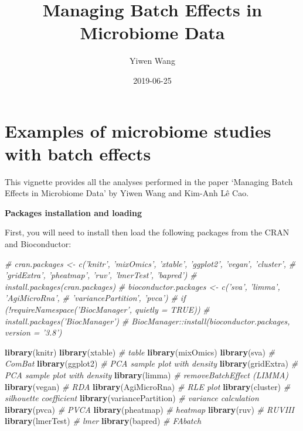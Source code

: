 \documentclass[]{book}
\title{Managing Batch Effects in Microbiome Data}
\author{Yiwen Wang}
\date{2019-06-25}
\newenvironment{Shaded}{\begin{snugshade}}{\end{snugshade}}
\newcommand{\KeywordTok}[1]{\textcolor[rgb]{0.13,0.29,0.53}{\textbf{#1}}}
\newcommand{\CommentTok}[1]{\textcolor[rgb]{0.56,0.35,0.01}{\textit{#1}}}
\newcommand{\NormalTok}[1]{#1}
\begin{document}
\maketitle

{
\setcounter{tocdepth}{3}
\tableofcontents
}
\chapter{Examples of microbiome studies with batch
effects}\label{examples-of-microbiome-studies-with-batch-effects}

This vignette provides all the analyses performed in the paper `Managing
Batch Effects in Microbiome Data' by Yiwen Wang and Kim-Anh Lê Cao.

\textbf{Packages installation and loading}

First, you will need to install then load the following packages from
the CRAN and Bioconductor:

\begin{Shaded}
\begin{Highlighting}[]
\CommentTok{# cran.packages <- c('knitr', 'mixOmics', 'xtable', 'ggplot2', 'vegan', 'cluster',}
\CommentTok{#                   'gridExtra', 'pheatmap', 'ruv', 'lmerTest', 'bapred')}
\CommentTok{# install.packages(cran.packages)}
\CommentTok{# bioconductor.packages <- c('sva', 'limma', 'AgiMicroRna', }
\CommentTok{#                           'variancePartition', 'pvca')}
\CommentTok{# if (!requireNamespace('BiocManager', quietly = TRUE))}
\CommentTok{#     install.packages('BiocManager')}
\CommentTok{# BiocManager::install(bioconductor.packages, version = '3.8')}

\KeywordTok{library}\NormalTok{(knitr)}
\KeywordTok{library}\NormalTok{(xtable) }\CommentTok{# table}
\KeywordTok{library}\NormalTok{(mixOmics)}
\KeywordTok{library}\NormalTok{(sva) }\CommentTok{# ComBat}
\KeywordTok{library}\NormalTok{(ggplot2) }\CommentTok{# PCA sample plot with density}
\KeywordTok{library}\NormalTok{(gridExtra) }\CommentTok{# PCA sample plot with density}
\KeywordTok{library}\NormalTok{(limma) }\CommentTok{# removeBatchEffect (LIMMA)}
\KeywordTok{library}\NormalTok{(vegan) }\CommentTok{# RDA}
\KeywordTok{library}\NormalTok{(AgiMicroRna) }\CommentTok{# RLE plot}
\KeywordTok{library}\NormalTok{(cluster) }\CommentTok{# silhouette coefficient}
\KeywordTok{library}\NormalTok{(variancePartition) }\CommentTok{# variance calculation}
\KeywordTok{library}\NormalTok{(pvca) }\CommentTok{# PVCA}
\KeywordTok{library}\NormalTok{(pheatmap) }\CommentTok{# heatmap}
\KeywordTok{library}\NormalTok{(ruv) }\CommentTok{# RUVIII}
\KeywordTok{library}\NormalTok{(lmerTest) }\CommentTok{# lmer}
\KeywordTok{library}\NormalTok{(bapred) }\CommentTok{# FAbatch}
\end{Highlighting}
\end{Shaded}
\end{document}
